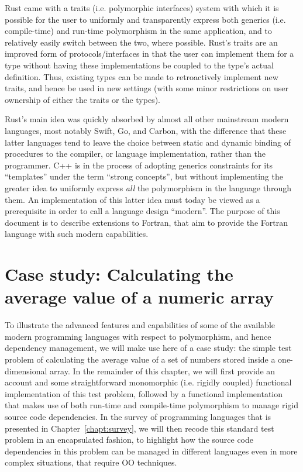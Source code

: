 \documentclass[11pt,oneside]{report}
\begin{document}
Rust came with a traits (i.e. polymorphic interfaces) system with which
it is possible for the user to uniformly and transparently express
both generics (i.e. compile-time) and run-time polymorphism in the
same application, and to relatively easily switch between the two,
where possible. Rust's traits are an improved form of
protocols/interfaces in that the user can implement them for a type
without having these implementations be coupled to the type's actual
definition. Thus, existing types can be made to retroactively
implement new traits, and hence be used in new settings (with some
minor restrictions on user ownership of either the traits or the
types).

Rust's main idea was quickly absorbed by almost all other mainstream
modern languages, most notably Swift, Go, and Carbon, with the
difference that these latter languages tend to leave the choice
between static and dynamic binding of procedures to the compiler, or
language implementation, rather than the programmer. C++ is in the
process of adopting generics constraints for its ``templates'' under
the term ``strong concepts'', but without implementing the greater
idea to uniformly express \emph{all} the polymorphism in the language
through them. An implementation of this latter idea must today be
viewed as a prerequisite in order to call a language design
``modern''. The purpose of this document is to describe extensions to
Fortran, that aim to provide the Fortran language with such modern
capabilities.

\chapter{Case study: Calculating the average value of a numeric array}

To illustrate the advanced features and capabilities of some of the
available modern programming languages with respect to polymorphism,
and hence dependency management, we will make use here of a case
study: the simple test problem of calculating the average value of a
set of numbers stored inside a one-dimensional array. In the remainder
of this chapter, we will first provide an account and some
straightforward monomorphic (i.e. rigidly coupled) functional
implementation of this test problem, followed by a functional
implementation that makes use of both run-time and compile-time
polymorphism to manage rigid source code dependencies. In the survey
of programming languages that is presented in
Chapter~\ref{chapt:survey}, we will then recode this standard test
problem in an encapsulated fashion, to highlight how the source code
dependencies in this problem can be managed in different languages
even in more complex situations, that require OO techniques.
\end{document}
